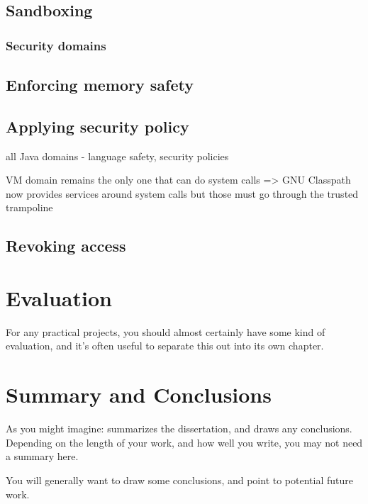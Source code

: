 \documentclass[a4paper,12pt,twoside,openright]{report}
\begin{document}
\section{Sandboxing}

\subsection{Security domains}

\section{Enforcing memory safety}

\section{Applying security policy}

all Java domains - language safety, security policies

VM domain remains the only one that can do system calls => GNU Classpath now provides services around system calls but those must go through the trusted trampoline

\section{Revoking access}

\chapter{Evaluation} 

For any practical projects, you should almost certainly have
some kind of evaluation, and it's often useful to separate 
this out into its own chapter. 


\chapter{Summary and Conclusions} 

As you might imagine: summarizes the dissertation, and draws 
any conclusions. Depending on the length of your work, and 
how well you write, you may not need a summary here. 

You will generally want to draw some conclusions, and point
to potential future work. 




\appendix
\singlespacing

 
 
\end{document}
